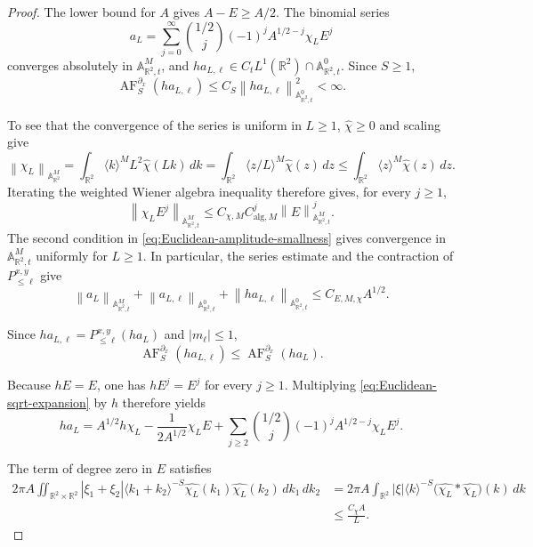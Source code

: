 \documentclass[12pt,reqno,letterpaper]{amsart}
\numberwithin{equation}{section}
\theoremstyle{definition}
\newcommand{\R}{\mathbb R}
\newcommand{\A}{\mathbb A}
\newcommand{\norm}[1]{\left\lVert #1\right\rVert}
\newcommand{\abs}[1]{\left\lvert #1\right\rvert}
\begin{document}
\begin{proof}
The lower bound for $A$ gives $A-E\geq A/2$.  The binomial series
\begin{equation}\label{eq:Euclidean-sqrt-expansion}
   a_L
   =\sum_{j=0}^{\infty}\binom{1/2}{j}(-1)^j
       A^{1/2-j}\chi_LE^j
\end{equation}
converges absolutely in $\A^M_{\R^2,t}$, and
$h a_{L,\ell}\in C_tL^1(\R^2)\cap\A^0_{\R^2,t}$.  Since $S\geq1$,
\[
 \operatorname{AF}^{\partial_x}_S(h a_{L,\ell})
 \leq C_S\norm{h a_{L,\ell}}_{\A^0_{\R^2,t}}^2<\infty.
\]

To see that the convergence of the series is
uniform in $L\geq1$, $\widehat\chi\geq0$ and scaling give
\[
 \norm{\chi_L}_{\A^M_{\R^2}}
 =\int_{\R^2}\langle k\rangle^M L^2\widehat\chi(Lk)\,dk
 =\int_{\R^2}\langle z/L\rangle^M\widehat\chi(z)\,dz
 \leq\int_{\R^2}\langle z\rangle^M\widehat\chi(z)\,dz.
\]
Iterating the weighted Wiener algebra inequality therefore gives, for
every $j\geq1$,
\[
 \norm{\chi_LE^j}_{\A^M_{\R^2,t}}
 \leq C_{\chi,M}C_{\mathrm{alg},M}^j
       \norm E_{\A^M_{\R^2,t}}^j.
\]
The second condition in \eqref{eq:Euclidean-amplitude-smallness} gives
convergence in $\A^M_{\R^2,t}$ uniformly for $L\geq1$.
In particular, the series estimate and the contraction of
$P_{\leq\ell}^{x,y}$ give
\begin{equation}\label{eq:Euclidean-amplitude-Wiener-bounds}
 \norm{a_L}_{\A^M_{\R^2,t}}
 +\norm{a_{L,\ell}}_{\A^0_{\R^2,t}}
 +\norm{h a_{L,\ell}}_{\A^0_{\R^2,t}}
 \leq C_{E,M,\chi}A^{1/2}.
\end{equation}

Since $h a_{L,\ell}=P_{\leq\ell}^{x,y}(h a_L)$ and
$\abs{m_\ell}\leq1$,
\begin{equation}\label{eq:Euclidean-AF-cutoff-contraction}
   \operatorname{AF}^{\partial_x}_S(h a_{L,\ell})
      \leq\operatorname{AF}^{\partial_x}_S(h a_L).
\end{equation}

Because $hE=E$, one has $hE^j=E^j$ for every $j\geq1$.  Multiplying
\eqref{eq:Euclidean-sqrt-expansion} by $h$ therefore yields
\begin{equation}\label{eq:Euclidean-h-amplitude-series}
 h a_L=A^{1/2}h\chi_L-\frac{1}{2A^{1/2}}\chi_LE
 +\sum_{j\geq2}\binom{1/2}{j}(-1)^j
        A^{1/2-j}\chi_LE^j.
\end{equation}

The term of degree zero in $E$ satisfies
\begin{align*}
 2\pi A\iint_{\R^2\times\R^2}
   \abs{\xi_1+\xi_2}\langle k_1+k_2\rangle^{-S}
   \widehat{\chi_L}(k_1)\widehat{\chi_L}(k_2)
   \,dk_1\,dk_2
 &=2\pi A\int_{\R^2}\abs\xi\langle k\rangle^{-S}
      \bigl(\widehat{\chi_L}*\widehat{\chi_L}\bigr)(k)\,dk\\
 &\leq\frac{C_\chi A}{L}.
\end{align*}


\end{proof}
\end{document}
